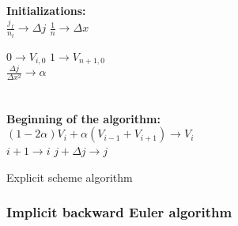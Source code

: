 \documentclass[a4paper, twoside, 11pt]{report}
\theoremstyle{theorem}
\theoremstyle{remark}
\theoremstyle{exemple}
\begin{document}
                    \begin{center}
                    \begin{algorithm}[H]

                    \SetAlgoLined

                         \\
                         \\
                         

                        \textbf{Initializations:}  \\
                            $\displaystyle \frac{j_f}{n_t} \rightarrow \Delta j$
                            $\displaystyle \frac{1}{n} \rightarrow \Delta x$

                            {
                                $0 \rightarrow V_{i,0}$
                            }
                            $1 \rightarrow V_{n+1,0}$  \\

                            $\displaystyle \frac{\Delta j}{\Delta x^2} \rightarrow \alpha$\\
                            \ \\
                            \ \\
                            \textbf{Beginning of the algorithm:} \\
                            {
                                {
                                    $(1-2\alpha)V_i + \alpha(V_{i-1} + V_{i+1}) \rightarrow V_i$ \\
                                    $i+1 \rightarrow i$
                                }
                                $j+\Delta j \rightarrow j$
                            }

                    \caption{Explicit scheme algorithm}
                    \end{algorithm}
                    \end{center}


            \subsubsection{Implicit backward Euler algorithm}
\end{document}
